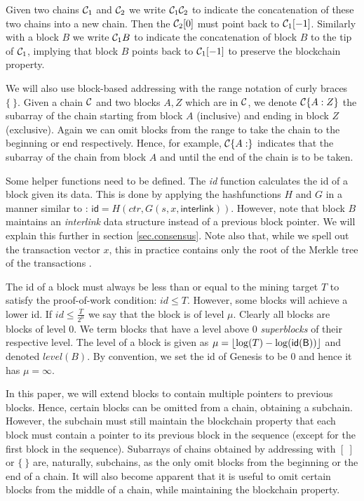 Given two chains $\mathcal{C}_1$ and $\mathcal{C}_2$ we write $\mathcal{C}_1 \mathcal{C}_2$ to
indicate the concatenation of these two chains into a new chain. Then the
$\mathcal{C}_2[0]$ must point back to $\mathcal{C}_1[-1]$. Similarly with a block $B$ we
write $\mathcal{C}_1 B$ to indicate the concatenation of block $B$ to the tip of
$\mathcal{C}_1$, implying that block $B$ points back to $\mathcal{C}_1[-1]$ to preserve
the blockchain property.

We will also use block-based addressing with the range notation of curly braces $\{~\}$.
Given a chain $\mathcal{C}$ and two blocks $A, Z$ which are in $\mathcal{C}$, we denote
$\mathcal{C}\{A:Z\}$ the subarray of the chain starting from block $A$ (inclusive)
and ending in block $Z$ (exclusive). Again we can omit blocks from the range to
take the chain to the beginning or end respectively. Hence, for example,
$\mathcal{C}\{A:\}$ indicates that the subarray of the chain from block $A$ and until
the end of the chain is to be taken.

Some helper functions need to be defined. The \textit{id} function
calculates the id of a block given its data. This is done by applying the
hashfunctions $H$ and $G$ in a manner similar to \cite{backbone}: $\textsf{id} =
H(ctr, G(s, x, \textsf{interlink}))$. However, note that block $B$ maintains an
\textit{interlink} data structure instead of a previous block pointer. We will
explain this further in section \ref{sec.consensus}. Note also that, while we
spell out the transaction vector $x$, this in practice contains only the root of
the Merkle tree of the transactions \cite{princetonbook}.

The id of a block must always be less than or equal to the mining target $T$ to
satisfy the proof-of-work\cite{antonopoulosbook} condition: $id \leq T$.
However, some blocks will achieve a lower id. If $id \leq \frac{T}{2^\mu}$ we
say that the block is of level $\mu$. Clearly all blocks are blocks of level
$0$. We term blocks that have a level above 0 \textit{superblocks} of their
respective level. The level of a block is given as $\mu = \left \lfloor \log(T) -
\log(\sf{id}(B)) \right \rfloor$ and denoted $\textit{level}(B)$. By convention,
we set the id of Genesis to be $0$ and hence it has $\mu = \infty$.

In this paper, we will extend blocks to contain multiple pointers to previous
blocks. Hence, certain blocks can be omitted from a chain, obtaining a subchain.
However, the subchain must still maintain the blockchain property that each
block must contain a pointer to its previous block in the sequence (except for
the first block in the sequence). Subarrays of chains obtained by addressing
with $[~]$ or $\{~\}$ are, naturally, subchains, as the only omit blocks from
the beginning or the end of a chain. It will also become apparent that it is
useful to omit certain blocks from the middle of a chain, while maintaining the
blockchain property.

